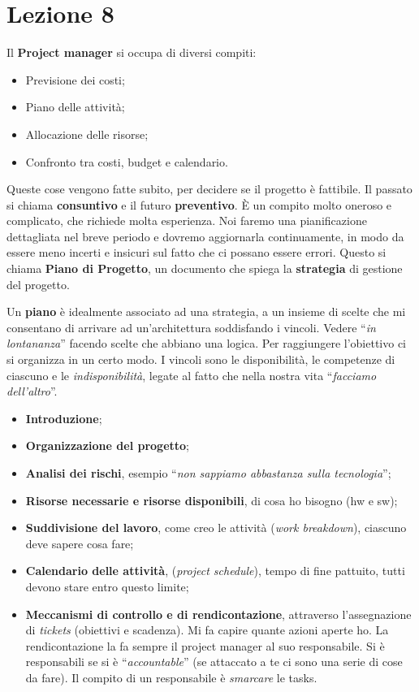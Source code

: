 \section{Lezione 8}

Il \textbf{Project manager} si occupa di diversi compiti:

\begin{itemize}

	\item Previsione dei costi;
	\item Piano delle attività;
	\item Allocazione delle risorse;
	\item Confronto tra costi, budget e calendario.

\end{itemize}

Queste cose vengono fatte subito, per decidere se il progetto è fattibile. Il passato si chiama \textbf{consuntivo} e il futuro \textbf{preventivo}. È un compito molto oneroso e complicato, che richiede molta esperienza. Noi faremo una pianificazione dettagliata nel breve periodo e dovremo aggiornarla continuamente, in modo da essere meno incerti e insicuri sul fatto che ci possano essere errori. Questo si chiama \textbf{Piano di Progetto}, un documento che spiega la \textbf{strategia} di gestione del progetto.

Un \textbf{piano} è idealmente associato ad una strategia, a un insieme di scelte che mi consentano di arrivare ad un'architettura soddisfando i vincoli. Vedere ``\textit{in lontananza}'' facendo scelte che abbiano una logica. Per raggiungere l'obiettivo ci si organizza in un certo modo. I vincoli sono le disponibilità, le competenze di ciascuno e le \textit{indisponibilità}, legate al fatto che nella nostra vita ``\textit{facciamo dell'altro}''.

\begin{itemize}

	\item \textbf{Introduzione};
	\item \textbf{Organizzazione del progetto};
	\item \textbf{Analisi dei rischi}, esempio ``\textit{non sappiamo abbastanza sulla tecnologia}'';
	\item \textbf{Risorse necessarie e risorse disponibili}, di cosa ho bisogno (hw e sw);
	\item \textbf{Suddivisione del lavoro}, come creo le attività (\textit{work breakdown}), ciascuno deve sapere cosa fare;
	\item \textbf{Calendario delle attività}, (\textit{project schedule}), tempo di fine pattuito, tutti devono stare entro questo limite;
	\item \textbf{Meccanismi di controllo e di rendicontazione}, attraverso l'assegnazione di \textit{tickets} (obiettivi e scadenza). Mi fa capire quante azioni aperte ho. La rendicontazione la fa sempre il project manager al suo responsabile. Si è responsabili se si è ``\textit{accountable}'' (se attaccato a te ci sono una serie di cose da fare). Il compito di un responsabile è \textit{smarcare} le tasks.

\end{itemize}

